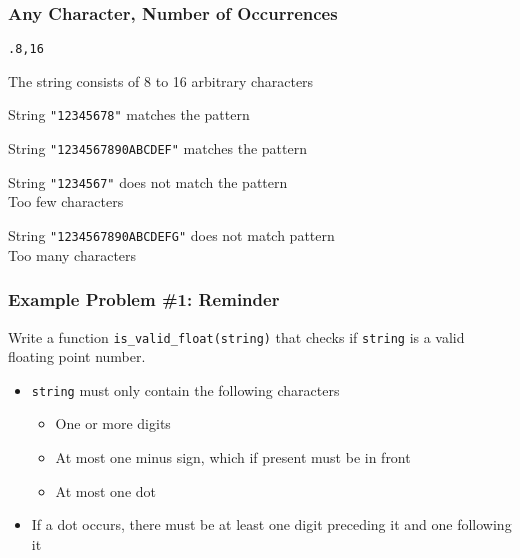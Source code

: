 \begin{frame}
  \frametitle{Any Character, Number of Occurrences}
  \begin{center}
    \texttt{.{8,16}}
  \end{center}
  \begin{center}
    The string consists of 8 to 16 arbitrary characters
  \end{center}
  \begin{overprint}
    \begin{center}
      String \texttt{"12345678"} matches the pattern \\[2mm]
    \end{center}

    \begin{center}
      String \texttt{"1234567890ABCDEF"} matches the pattern \\[2mm]
    \end{center}

    \begin{center}
      String \texttt{"1234567"} does not match the pattern \\[2mm]
      Too few characters
    \end{center}

    \begin{center}
      String \texttt{"1234567890ABCDEFG"} does not match pattern \\[2mm]
      Too many characters
    \end{center}
  \end{overprint}
\end{frame}

\begin{frame}
  \frametitle{Example Problem \#1: Reminder}
  \begin{center}
    Write a function \texttt{is\_valid\_float(string)} that checks if \texttt{string} is a valid floating point number.
  \end{center}
  \vskip5mm
  \begin{itemize}
    \item \texttt{string} must only contain the following characters
      \begin{itemize}
        \item One or more digits
        \item At most one minus sign, which if present must be in front
        \item At most one dot
      \end{itemize}
    \item If a dot occurs, there must be at least one digit preceding it and one following it
  \end{itemize}
\end{frame}

